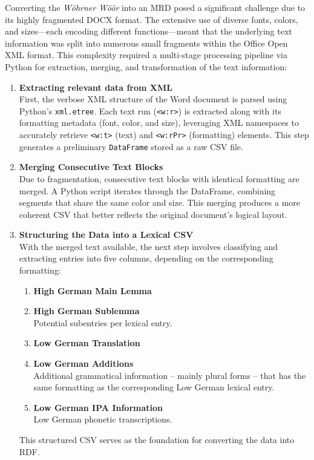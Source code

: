 Converting the \emph{Wöhrner Wöör} into an MRD posed a significant challenge due to its highly fragmented DOCX format. The extensive use of diverse fonts, colors, and sizes—each encoding different functions—meant that the underlying text information was split into numerous small fragments within the Office Open XML format. This complexity required a multi-stage processing pipeline via Python for extraction, merging, and transformation of the text information:

\begin{enumerate}
    \item \textsf{\textbf{Extracting relevant data from XML}}\\  
    First, the verbose XML structure of the Word document is parsed using Python’s \texttt{xml.etree}. Each text run (\texttt{<w:r>}) is extracted along with its formatting metadata (font, color, and size), leveraging XML namespaces to accurately retrieve \texttt{<w:t>} (text) and \texttt{<w:rPr>} (formatting) elements. This step generates a preliminary \texttt{DataFrame} stored as a raw CSV file.

    \item \textsf{\textbf{Merging Consecutive Text Blocks}}\\  
   Due to fragmentation, consecutive text blocks with identical formatting are merged. A Python script iterates through the DataFrame, combining segments that share the same color and size. This merging produces a more coherent CSV that better reflects the original document’s logical layout.

    \item \textsf{\textbf{Structuring the Data into a Lexical CSV}}\\  
    With the merged text available, the next step involves classifying and extracting entries into five columns, depending on the corresponding formatting:
    \begin{enumerate}
        \item {\textbf{High German Main Lemma}}
        \item {\textbf{High German Sublemma}}\\Potential subentries per lexical entry.
        \item {\textbf{Low German Translation}}
        \item {\textbf{Low German Additions}}\\ Additional grammatical information -- mainly plural forms -- that has the same formatting as the corresponding Low German lexical entry.
        \item {\textbf{Low German IPA Information}}\\Low German phonetic transcriptions.
    \end{enumerate}
    This structured CSV serves as the foundation for converting the data into RDF.


\end{enumerate}
